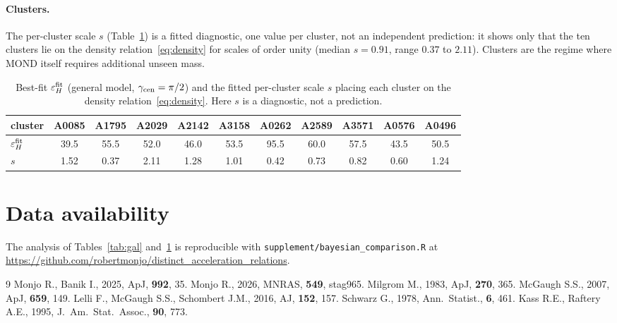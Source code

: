 \documentclass[11pt]{article}
\begin{document}
\paragraph{Clusters.}
The per-cluster scale $s$ (Table~\ref{tab:clu}) is a fitted diagnostic, one value
per cluster, not an independent prediction: it shows only that the ten clusters lie
on the density relation~\eqref{eq:density} for scales of order unity (median
$s=0.91$, range $0.37$ to $2.11$). Clusters are the regime where MOND itself
requires additional unseen mass.

\begin{table}[htbp]
\centering\small
\setlength{\tabcolsep}{4.5pt}
\caption{Best-fit $\varepsilon_H^{\rm fit}$ (general model, $\gamma_{\rm cen}=\pi/2$)
and the fitted per-cluster scale $s$ placing each cluster on the density
relation~\eqref{eq:density}. Here $s$ is a diagnostic, not a prediction.}
\label{tab:clu}
\begin{tabular}{lcccccccccc}
\toprule
cluster & A0085 & A1795 & A2029 & A2142 & A3158 & A0262 & A2589 & A3571 & A0576 & A0496 \\
\midrule
$\varepsilon_H^{\rm fit}$ & 39.5 & 55.5 & 52.0 & 46.0 & 53.5 & 95.5 & 60.0 & 57.5 & 43.5 & 50.5 \\
$s$ & 1.52 & 0.37 & 2.11 & 1.28 & 1.01 & 0.42 & 0.73 & 0.82 & 0.60 & 1.24 \\
\bottomrule
\end{tabular}
\end{table}

\section*{Data availability}
The analysis of Tables~\ref{tab:gal} and~\ref{tab:clu} is reproducible with
\texttt{supplement/bayesian\_comparison.R} at
\url{https://github.com/robertmonjo/distinct_acceleration_relations}.

\begin{thebibliography}{9}
\footnotesize
{} Monjo R., Banik I., 2025, ApJ, \textbf{992}, 35.
 Monjo R., 2026, MNRAS, \textbf{549}, stag965.
 Milgrom M., 1983, ApJ, \textbf{270}, 365.
 McGaugh S.S., 2007, ApJ, \textbf{659}, 149.
 Lelli F., McGaugh S.S., Schombert J.M., 2016, AJ, \textbf{152}, 157.
 Schwarz G., 1978, Ann.\ Statist., \textbf{6}, 461.
 Kass R.E., Raftery A.E., 1995, J.\ Am.\ Stat.\ Assoc., \textbf{90}, 773.
\end{thebibliography}
\end{document}
